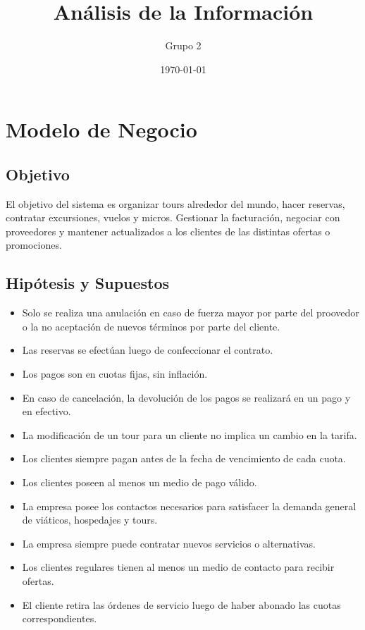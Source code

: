 \documentclass[12pt,a4paper]{article}
\title{Análisis de la Información}
\author{
        Grupo 2
}
\date{\today}
\begin{document}
%


\maketitle\thispagestyle{empty}

\newpage\null\thispagestyle{empty}\newpage

\newpage
\tableofcontents

\newpage\null\thispagestyle{empty}\newpage

\section{Modelo de Negocio}
	\subsection{Objetivo}
		El objetivo del sistema es organizar tours alrededor del mundo, hacer reservas, contratar excursiones, vuelos y micros. Gestionar la facturación, negociar con proveedores y mantener actualizados a los clientes de las distintas ofertas o promociones.

	\subsection{Hipótesis y Supuestos}
		\begin{itemize}
			\item Solo se realiza una anulación en caso de fuerza mayor por parte del proovedor o la no aceptación de nuevos términos por parte del cliente.
			\item Las reservas se efectúan luego de confeccionar el contrato.
			\item Los pagos son en cuotas fijas, sin inflación.
			\item En caso de cancelación, la devolución de los pagos se realizará en un pago y en efectivo.
			\item La modificación de un tour para un cliente no implica un cambio en la tarifa.
			\item Los clientes siempre pagan antes de la fecha de vencimiento de cada cuota.
			\item Los clientes poseen al menos un medio de pago válido.
			\item La empresa posee los contactos necesarios para satisfacer la demanda general de viáticos, hospedajes y tours.
			\item La empresa siempre puede contratar nuevos servicios o alternativas.
			\item Los clientes regulares tienen al menos un medio de contacto para recibir ofertas.
			\item El cliente retira las órdenes de servicio luego de haber abonado las cuotas correspondientes.
		\end{itemize}
\end{document}
